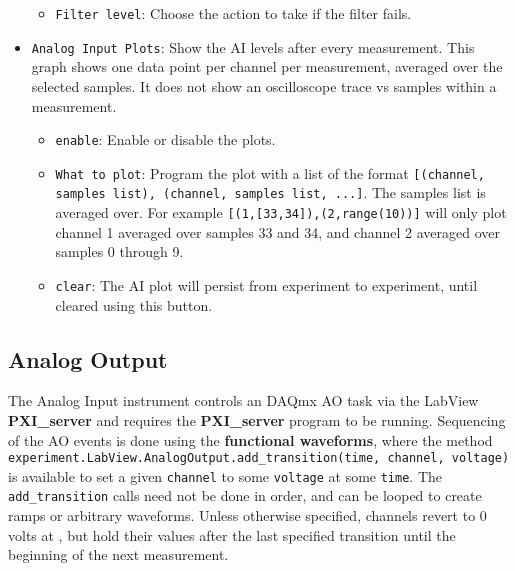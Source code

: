 \documentclass[pdftex,11pt,letterpaper]{article}
\begin{document}
\begin{itemize}
\begin{itemize}
\item \texttt{Filter level}:  Choose the action to take if the filter fails.
\end{itemize}
\item \texttt{Analog Input Plots}:  Show the AI levels after every measurement.  This graph shows one data point per channel per measurement, averaged over the selected samples.  It does not show an oscilloscope trace vs samples within a measurement.
\begin{itemize}
\item \texttt{enable}:  Enable or disable the plots.
\item \texttt{What to plot}:  Program the plot with a list of the format \texttt{[(channel, samples list), (channel, samples list, ...]}.  The samples list is averaged over.  For example \texttt{[(1,[33,34]),(2,range(10))]} will only plot channel 1 averaged over samples 33 and 34, and channel 2 averaged over samples 0 through 9.
\item \texttt{clear}:  The AI plot will persist from experiment to experiment, until cleared using this button.
\end{itemize}
\end{itemize}

\subsection{Analog Output}

The Analog Input instrument controls an DAQmx AO task via the LabView \textbf{PXI\_server} and requires the \textbf{PXI\_server} program to be running.  Sequencing of the AO events is done using the \textbf{functional waveforms}, where the method \texttt{experiment.LabView.AnalogOutput.add\_transition(time, channel, voltage)} is available to set a given \texttt{channel} to some \texttt{voltage} at some \texttt{time}.  The \texttt{add\_transition} calls need not be done in order, and can be looped to create ramps or arbitrary waveforms.  Unless otherwise specified, channels revert to 0 volts at , but hold their values after the last specified transition until the beginning of the next measurement.
\end{document}
